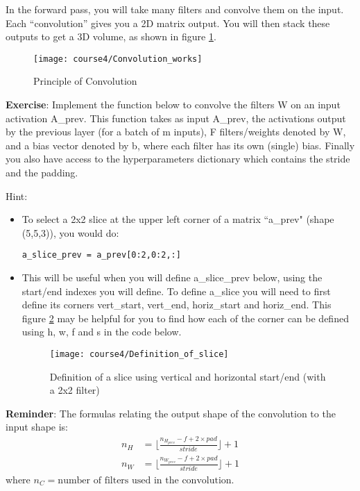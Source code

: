 {\clearpage
{}
In the forward pass, you will take many filters and convolve them on the input. Each ``convolution'' gives you a 2D matrix output. You will then stack these outputs to get a 3D volume, as shown in figure \ref{Convolution_works}.
\begin{figure}[h]
\begin{center}
\texttt{[image: course4/Convolution\_works]}
\caption{Principle of Convolution}
\label{Convolution_works}
\end{center}
\end{figure}


{\textbf {Exercise}}: Implement the function below to convolve the filters W on an input activation A\_prev. This function takes as input A\_prev, the activations output by the previous layer (for a batch of m inputs), F filters/weights denoted by W, and a bias vector denoted by b, where each filter has its own (single) bias. Finally you also have access to the hyperparameters dictionary which contains the stride and the padding.

Hint:
\begin{itemize}
\item To select a 2x2 slice at the upper left corner of a matrix ``a\_prev" (shape (5,5,3)), you would do:
\begin{verbatim}
a_slice_prev = a_prev[0:2,0:2,:]
\end{verbatim}
\item This will be useful when you will define a\_slice\_prev below, using the start/end indexes you will define.
To define a\_slice you will need to first define its corners vert\_start, vert\_end, horiz\_start and horiz\_end. This figure \ref{Definition_of_slice} may be helpful for you to find how each of the corner can be defined using h, w, f and s in the code below.
\begin{figure}[h]
\begin{center}
\texttt{[image: course4/Definition\_of\_slice]}
\caption{Definition of a slice using vertical and horizontal start/end (with a 2x2 filter) }
\label{Definition_of_slice}
\end{center}
\end{figure}

\end{itemize}


{\textbf {Reminder}}:
The formulas relating the output shape of the convolution to the input shape is:
\begin{equation}
\begin{aligned}
n_H &= \lfloor \frac{n_{H_{prev}} - f + 2 \times pad}{stride} \rfloor +1\\
n_W &= \lfloor \frac{n_{W_{prev}} - f + 2 \times pad}{stride} \rfloor +1 
\end{aligned}
\end{equation}
where $n_C = \text{number of filters used in the convolution}$.

}
